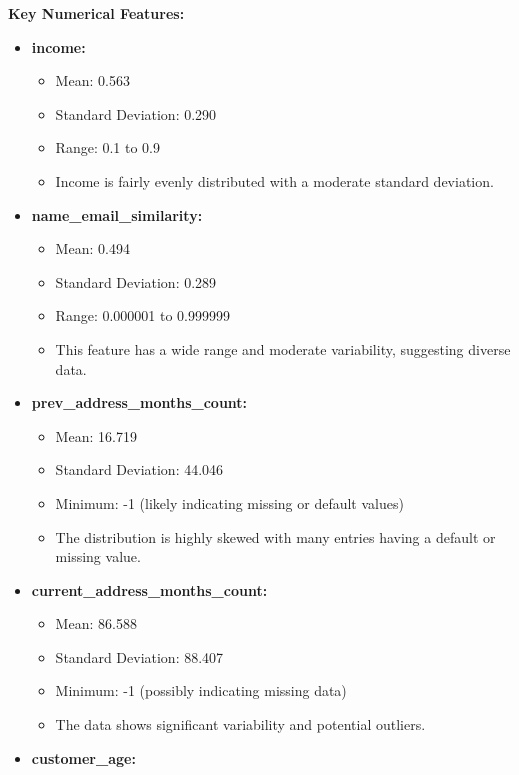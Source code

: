 \documentclass[12pt,a4paper]{report}
\begin{document}
\textbf{Key Numerical Features:}
\begin{itemize}
    \item \textbf{income:}
        \begin{itemize}
            \item Mean: 0.563
            \item Standard Deviation: 0.290
            \item Range: 0.1 to 0.9
            \item Income is fairly evenly distributed with a moderate standard deviation.
        \end{itemize}
    \item \textbf{name\_email\_similarity:}
        \begin{itemize}
            \item Mean: 0.494
            \item Standard Deviation: 0.289
            \item Range: 0.000001 to 0.999999
            \item This feature has a wide range and moderate variability, suggesting diverse data.
        \end{itemize}
    \item \textbf{prev\_address\_months\_count:}
        \begin{itemize}
            \item Mean: 16.719
            \item Standard Deviation: 44.046
            \item Minimum: -1 (likely indicating missing or default values)
            \item The distribution is highly skewed with many entries having a default or missing value.
        \end{itemize}
    \item \textbf{current\_address\_months\_count:}
        \begin{itemize}
            \item Mean: 86.588
            \item Standard Deviation: 88.407
            \item Minimum: -1 (possibly indicating missing data)
            \item The data shows significant variability and potential outliers.
        \end{itemize}
    \item \textbf{customer\_age:}
        \begin{itemize}

\end{itemize}
\end{itemize}
\end{document}
